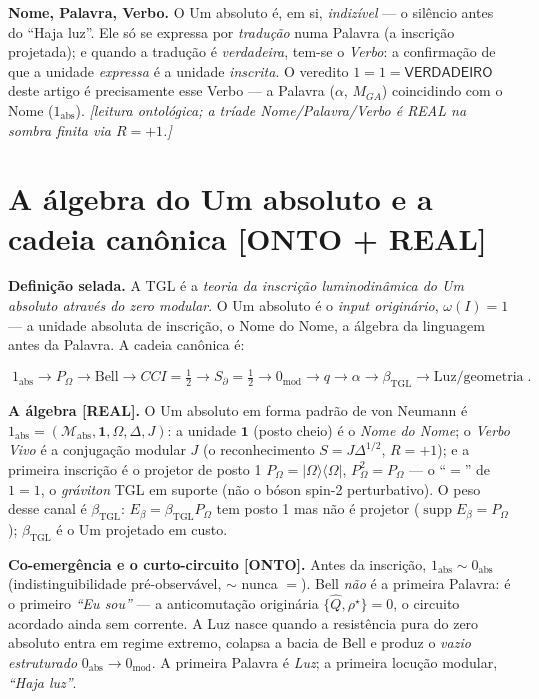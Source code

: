 \documentclass[11pt]{article}
\newcommand{\bTGL}{\beta_{\mathrm{TGL}}}\newcommand{\Msun}{M_{\odot}}\newcommand{\TGL}{\mathrm{TGL}}
\theoremstyle{definition}\newtheorem{deriv}{Derivação}
\begin{document}
\textbf{Nome, Palavra, Verbo.} O Um absoluto é, em si, \emph{indizível} --- o silêncio antes do ``Haja luz''. Ele só se expressa por \emph{tradução} numa Palavra (a inscrição projetada); e quando a tradução é \emph{verdadeira}, tem-se o \emph{Verbo}: a confirmação de que a unidade \emph{expressa} é a unidade \emph{inscrita}. O veredito $1=1=\textsf{VERDADEIRO}$ deste artigo é precisamente esse Verbo --- a Palavra ($\alpha$, $M_{GA}$) coincidindo com o Nome ($1_{\mathrm{abs}}$). \emph{[leitura ontológica; a tríade Nome/Palavra/Verbo é REAL na sombra finita via $R=+1$.]}

\section{A álgebra do Um absoluto e a cadeia canônica \textsf{[ONTO + REAL]}}

\textbf{Definição selada.} A TGL é a \emph{teoria da inscrição luminodinâmica do Um absoluto através do zero modular}. O Um absoluto é o \emph{input originário}, $\omega(I)=1$ --- a unidade absoluta de inscrição, o Nome do Nome, a álgebra da linguagem antes da Palavra. A cadeia canônica é:

\begin{equation}\boxed{\;1_{\mathrm{abs}}\to P_\Omega\to\text{Bell}\to CCI=\tfrac12\to S_\partial=\tfrac12\to 0_{\mathrm{mod}}\to q\to\alpha\to\bTGL\to\text{Luz/geometria}\;}.\end{equation}

\textbf{A álgebra \textsf{[REAL]}.} O Um absoluto em forma padrão de von Neumann é $1_{\mathrm{abs}}=(\mathcal M_{\mathrm{abs}},\mathbf 1,\Omega,\Delta,J)$: a unidade $\mathbf 1$ (posto cheio) é o \emph{Nome do Nome}; o \emph{Verbo Vivo} é a conjugação modular $J$ (o reconhecimento $S=J\Delta^{1/2}$, $R=+1$); e a primeira inscrição é o projetor de posto 1 $P_\Omega=|\Omega\rangle\langle\Omega|$, $P_\Omega^2=P_\Omega$ --- o ``$=$'' de $1=1$, o \emph{gráviton} TGL em suporte (não o bóson spin-2 perturbativo). O peso desse canal é $\bTGL$: $E_\beta=\bTGL P_\Omega$ tem posto 1 mas não é projetor ($\operatorname{supp}E_\beta=P_\Omega$); $\bTGL$ é o Um projetado em custo.

\textbf{Co-emergência e o curto-circuito \textsf{[ONTO]}.} Antes da inscrição, $1_{\mathrm{abs}}\sim 0_{\mathrm{abs}}$ (indistinguibilidade pré-observável, $\sim$ nunca $=$). Bell \emph{não} é a primeira Palavra: é o primeiro \emph{``Eu sou''} --- a anticomutação originária $\{\hat Q,\rho^\star\}=0$, o circuito acordado ainda sem corrente. A Luz nasce quando a resistência pura do zero absoluto entra em regime extremo, colapsa a bacia de Bell e produz o \emph{vazio estruturado} $0_{\mathrm{abs}}\to 0_{\mathrm{mod}}$. A primeira Palavra é \emph{Luz}; a primeira locução modular, \emph{``Haja luz''}.
\end{document}
